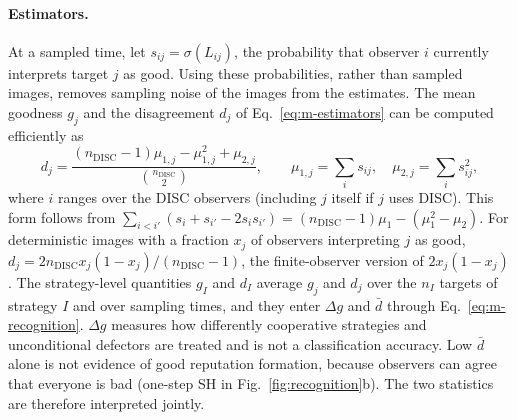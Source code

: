\documentclass[fleqn,10pt]{wlscirep}
\newcommand{\DISC}{\mathrm{DISC}}
\theoremstyle{plain}
\begin{document}
\paragraph{Estimators.} At a sampled time, let $s_{ij}=\sigma(L_{ij})$, the probability that observer $i$ currently interprets target $j$ as good. Using these probabilities, rather than sampled images, removes sampling noise of the images from the estimates. The mean goodness $g_j$ and the disagreement $d_j$ of Eq.~\eqref{eq:m-estimators} can be computed efficiently as
\begin{equation}
d_j=\frac{(n_{\DISC}-1)\mu_{1,j}-\mu_{1,j}^2+\mu_{2,j}}{\binom{n_{\DISC}}{2}},\qquad \mu_{1,j}=\sum_is_{ij},\quad \mu_{2,j}=\sum_is_{ij}^2,
\label{eq:s-estimators}
\end{equation}
where $i$ ranges over the DISC observers (including $j$ itself if $j$ uses DISC). This form follows from $\sum_{i<i'}(s_i+s_{i'}-2s_is_{i'})=(n_{\DISC}-1)\mu_1-(\mu_1^2-\mu_2)$. For deterministic images with a fraction $x_j$ of observers interpreting $j$ as good, $d_j=2n_{\DISC}x_j(1-x_j)/(n_{\DISC}-1)$, the finite-observer version of $2x_j(1-x_j)$. The strategy-level quantities $g_I$ and $d_I$ average $g_j$ and $d_j$ over the $n_I$ targets of strategy $I$ and over sampling times, and they enter $\Delta g$ and $\bar d$ through Eq.~\eqref{eq:m-recognition}. $\Delta g$ measures how differently cooperative strategies and unconditional defectors are treated and is not a classification accuracy. Low $\bar d$ alone is not evidence of good reputation formation, because observers can agree that everyone is bad (one-step SH in Fig.~\ref{fig:recognition}b). The two statistics are therefore interpreted jointly.
\end{document}
